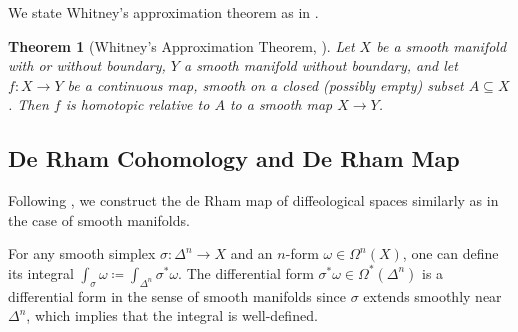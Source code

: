 \documentclass{scrartcl}
\theoremstyle{plain}
\newtheorem{theorem}{Theorem}[section]
\newtheorem{corollary}[theorem]{Corollary}
\theoremstyle{definition}
\renewcommand{\subset}{\subseteq}
\newcommand{\defeq}{\coloneqq}
\DeclareMathOperator{\Map}{Map}
\begin{document}
We state Whitney's approximation theorem as in \cite[Theorem 6.26]{lee2003introduction}.
\begin{theorem}[Whitney's Approximation Theorem, ]
    Let $X$ be a smooth manifold with or without boundary, $Y$ a smooth manifold without boundary, and let $f\colon X\to Y$ be a continuous map, smooth on a closed (possibly empty) subset $A\subset X$. Then $f$ is homotopic relative to $A$ to a smooth map $X\to Y$.
\end{theorem}






\subsection{De Rham Cohomology and De Rham Map} \label{subsec:diffeological-de-rham}
Following \cite{gurer2014topologie}, we construct the de Rham map of diffeological spaces similarly as in the case of smooth manifolds. 

For any smooth simplex $\sigma\colon \Delta^n\to X$ and an $n$-form $\omega\in\Omega^n(X)$, one can define its integral $\int_{\sigma}\omega \defeq \int_{\Delta^n}\sigma^*\omega$. The differential form $\sigma^*\omega\in\Omega^*(\Delta^n)$ is a differential form in the sense of smooth manifolds since $\sigma$ extends smoothly near $\Delta^n$, which implies that the integral is well-defined.
\end{document}
